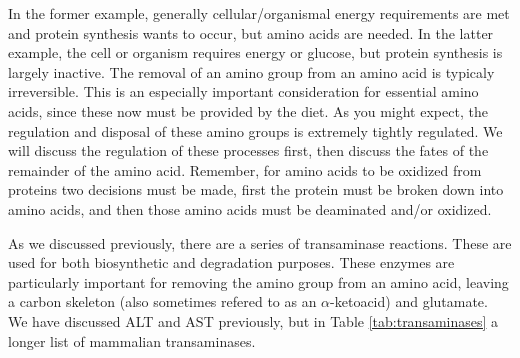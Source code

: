 \documentclass{tufte-handout}
\begin{document}
In the former example, generally cellular/organismal energy requirements are met and protein synthesis wants to occur, but amino acids are needed.  In the latter example, the cell or organism requires energy or glucose, but protein synthesis is largely inactive.  The removal of an amino group from an amino acid is typicaly irreversible.  This is an especially important consideration for essential amino acids, since these now must be provided by the diet.  As you might expect, the regulation and disposal of these amino groups is extremely tightly regulated.  We will discuss the regulation of these processes first, then discuss the fates of the remainder of the amino acid.  Remember, for amino acids to be oxidized from proteins two decisions must be made, first the protein must be broken down into amino acids, and then those amino acids must be deaminated and/or oxidized.


  As we discussed previously, there are a series of transaminase reactions.  These are used for both biosynthetic and degradation purposes.  These enzymes are particularly important for removing the amino group from an amino acid, leaving a carbon skeleton (also sometimes refered to as an $\alpha$-ketoacid) and glutamate.  We have discussed ALT and AST previously, but in Table \ref{tab:transaminases} a longer list of mammalian transaminases.
\end{document}
